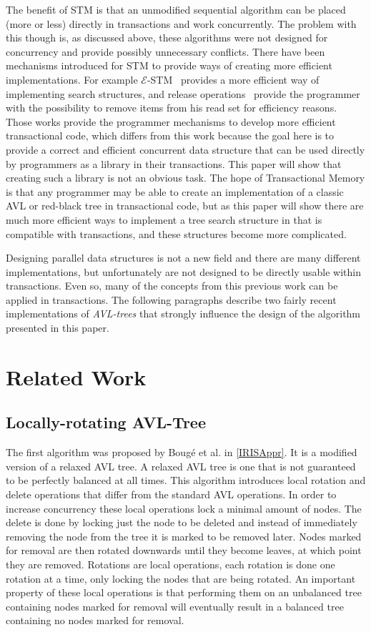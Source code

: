 \documentclass[10pt]{sigplanconf}
\begin{document}
The benefit of STM is that an unmodified sequential algorithm can be placed (more or less) directly in transactions and work concurrently.
The problem with this though is, as discussed above, these algorithms were not designed for concurrency and provide possibly unnecessary conflicts.
There have been mechanisms introduced for STM to provide ways of creating more efficient implementations.
For example ${\mathcal E}$-STM~\cite{FGG09} provides a more efficient 
way of implementing search structures, and release operations~\cite{HLMS03} 
provide the programmer with the possibility to remove items from his read set 
for efficiency reasons.
Those works provide the programmer mechanisms to develop more efficient transactional code, which differs from this work because the goal here is to provide a correct and efficient concurrent data
structure that can be used directly by programmers as a library in their transactions.
This paper will show that creating such a library is not an obvious task.
The hope of Transactional Memory is that any programmer may be able to create an implementation of a classic AVL or red-black tree in transactional code, but as this paper will show
there are much more efficient ways to implement a tree search structure in that is compatible with transactions, and these structures become more complicated.

Designing parallel data structures is not a new field and there are many different implementations, but unfortunately are not designed to be directly usable within transactions.
Even so, many of the concepts from this previous work can be applied in transactions.
The following paragraphs describe two fairly recent implementations of \emph{AVL-trees} that strongly influence the design of the algorithm presented in this paper.

\section{Related Work}

\subsection{Locally-rotating AVL-Tree}
The first algorithm was proposed by Boug\'e et al. in \ref{IRISAppr}.
It is a modified version of a relaxed AVL tree.
A relaxed AVL tree is one that is not guaranteed to be perfectly balanced at all times.
This algorithm introduces local rotation and delete operations that differ from the standard AVL operations.
In order to increase concurrency these local operations lock a minimal amount of nodes.
The delete is done by locking just the node to be deleted and instead of immediately removing the node from the tree it is marked to be removed later.
Nodes marked for removal are then rotated downwards until they become leaves, at which point they are removed.
Rotations are local operations, each rotation is done one rotation at a time, only locking the nodes that are being rotated.
An important property of these local operations is that performing them on an unbalanced tree containing nodes marked for removal will eventually result in a balanced tree containing no nodes marked for removal.
\end{document}
